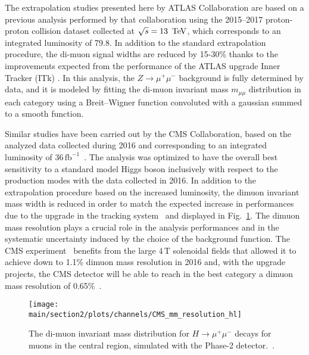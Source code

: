 The extrapolation studies presented here by ATLAS Collaboration are based on a previous analysis performed by that collaboration using the 2015--2017 proton-proton collision dataset collected at $\sqrt{s} = 13\,~\text{TeV}$, which corresponds to an integrated luminosity of 79.8\fbinv \cite{Aaboud:2017ojs}. 
In addition to the standard extrapolation procedure, the di-muon signal widths are reduced  by 15-30\% thanks to the improvements expected from the performance of the ATLAS upgrade Inner Tracker (ITk) \cite{Collaboration:2285585}.
In this analysis, the $Z\to\mu^{+}\mu^{-}$ background is fully determined by data, and it is modeled by fitting the di-muon invariant mass $m_{\mu\mu}$ distribution in each category using a Breit--Wigner function convoluted with a gaussian summed to a smooth function.

Similar studies have been carried out by the CMS Collaboration, based on the analyzed data collected during 2016 and corresponding to an integrated luminosity of $36\,\text{fb}^{-1}$~\cite{HIG-17-019}. 
The analysis was optimized to have the overall best sensitivity to a standard model Higgs boson inclusively with respect to the production modes with the data collected in 2016.
In addition to the extrapolation procedure based on the increased luminosity, the dimuon invariant mass width is reduced in order to match the expected increase in performances due to the upgrade in the tracking system~\cite{Klein:2017nke} and displayed in Fig.~\ref{fig:cms_hmm_res_hl}. The dimuon mass resolution plays a crucial role in the analysis performances and in the systematic uncertainty induced by the choice of the background function. 
The CMS experiment~\cite{CMS} benefits from the large $4\,\text{T}$ solenoidal fields that allowed it to achieve down to 1.1\% dimuon mass resolution in 2016 and, with the upgrade projects, the CMS detector will be able to reach in the best category a dimuon mass resolution of 0.65\%~\cite{Klein:2017nke}.

\begin{figure}[h!]
\begin{center}
\texttt{[image: \\main/section2/plots/channels/CMS\_mm\_resolution\_hl]}
\end{center}
\caption{The di-muon invariant mass distribution for $H\rightarrow{}\mu^+\mu^-$ decays for muons in the
central region, simulated with the Phase-2 detector.~\protect\cite{Klein:2017nke}.}
\label{fig:cms_hmm_res_hl}
\end{figure}



